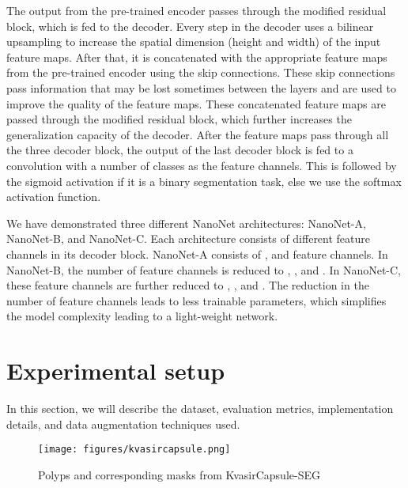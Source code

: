 \documentclass[journal]{IEEEtran}
\begin{document}
The output from the pre-trained encoder passes through the modified residual block, which is fed to the decoder. Every step in the decoder uses a bilinear upsampling to increase the spatial dimension (height and width) of the input feature maps. After that, it is concatenated with the appropriate feature maps from the pre-trained encoder using the skip connections. These skip connections pass information that may be lost sometimes between the layers and are used to improve the quality of the feature maps. These concatenated feature maps are passed through the modified residual block, which further increases the generalization capacity of the decoder.  After the feature maps pass through all the three decoder block, the output of the last decoder block is fed to a   convolution with a number of classes as the feature channels. This is followed by the sigmoid activation if it is a binary segmentation task, else we use the softmax activation function. 


We have demonstrated three different NanoNet architectures: NanoNet-A, NanoNet-B, and NanoNet-C. Each architecture consists of different feature channels in its decoder block. NanoNet-A consists of  ,  and  feature channels. In NanoNet-B, the number of feature channels is reduced to , , and . In NanoNet-C, these feature channels are further reduced to , , and . The reduction in the number of feature channels leads to less trainable parameters, which simplifies the model complexity leading to a light-weight network.


\section{Experimental setup}
\label{sec:materials used}
In this section, we will describe the dataset, evaluation metrics, implementation details, and data augmentation techniques used. 

\begin{figure} [!t]
    \centering
    \texttt{[image: figures/kvasircapsule.png]}
    \caption{Polyps and corresponding masks from KvasirCapsule-SEG}  
    \label{fig:polypandmasks}
\end{figure}
\end{document}
